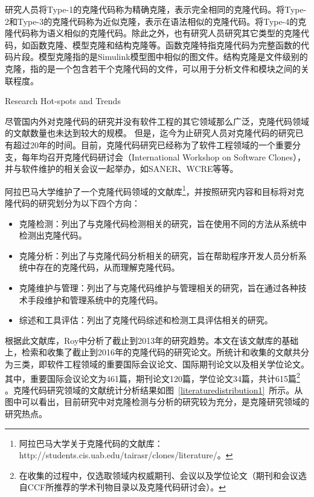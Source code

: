 研究人员将Type-1的克隆代码称为精确克隆，表示完全相同的克隆代码。将Type-2和Type-3的克隆代码称为近似克隆，表示在语法相似的克隆代码。将Type-4的克隆代码称为语义相似的克隆代码。除此之外，也有研究人员研究其它类型的克隆代码，如函数克隆\cite{roy2008empirical}、模型克隆\cite{alalfi2012models}和结构克隆\cite{basit2009data,basit2005detecting}等。函数克隆特指克隆代码为完整函数的代码片段。模型克隆指的是Simulink模型图中相似的图文件。结构克隆是文件级别的克隆，指的是一个包含若干个克隆代码的文件，可以用于分析文件和模块之间的关联程度。

{Research Hot-spots and Trends}

尽管国内外对克隆代码的研究并没有软件工程的其它领域那么广泛，克隆代码领域的文献数量也未达到较大的规模。
但是，迄今为止研究人员对克隆代码的研究已有超过20年的时间。目前，克隆代码研究已经称为了软件工程领域的一个重要分支，每年均召开克隆代码研讨会（International Workshop on Software Clones），并与软件维护的相关会议一起举办，如SANER、WCRE等等。


阿拉巴马大学维护了一个克隆代码领域的文献库\footnote{  阿拉巴马大学关于克隆代码的文献库：http://students.cis.uab.edu/tairasr/clones/literature/。}，并按照研究内容和目标将对克隆代码的研究划分为以下四个方向：

\begin{itemize}
\item 
克隆检测：列出了与克隆代码检测相关的研究，旨在使用不同的方法从系统中检测出克隆代码。
\item 
克隆分析：列出了与克隆代码分析相关的研究，旨在帮助程序开发人员分析系统中存在的克隆代码，从而理解克隆代码。
\item 
克隆维护与管理：列出了与克隆代码维护与管理相关的研究，旨在通过各种技术手段维护和管理系统中的克隆代码。
\item 
综述和工具评估：列出了克隆代码综述和检测工具评估相关的研究。
\end{itemize}

根据此文献库，Roy中分析了截止到2013年的研究趋势\cite{roy2014vision}。本文在该文献库的基础上，检索和收集了截止到2016年的克隆代码的研究论文。所统计和收集的文献共分为三类，即软件工程领域的重要国际会议论文、国际期刊论文以及相关学位论文。其中，重要国际会议论文为461篇，期刊论文120篇，学位论文34篇，共计615篇\footnote{在收集的过程中，仅选取领域内权威期刊、会议以及学位论文（期刊和会议选自CCF所推荐的学术刊物目录以及克隆代码研讨会）。} 。克隆代码研究领域的文献统计分析结果如图~\ref{literaturedistribution1}~所示。从图中可以看出，目前研究中对克隆检测与分析的研究较为充分，是克隆研究领域的研究热点。

